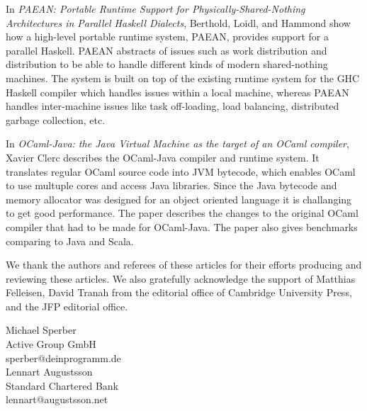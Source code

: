 \documentclass{jfp1}
\begin{document}
In \textit{PAEAN: Portable Runtime Support for Physically-Shared-Nothing Architectures in Parallel Haskell Dialects},
Berthold, Loidl, and Hammond show how a high-level portable runtime system, PAEAN, provides
support for a parallel Haskell.
PAEAN abstracts of issues such as work distribution and distribution to be able
to handle different kinds of modern shared-nothing machines.
The system is built on top of the existing runtime system for the GHC Haskell compiler
which handles issues within a local machine, whereas PAEAN handles inter-machine
issues like task off-loading, load balancing, distributed garbage collection, etc.

In \textit{OCaml-Java: the Java Virtual Machine as the target of an OCaml compiler},
Xavier Clerc describes the OCaml-Java compiler and runtime system.
It translates regular OCaml source code into JVM bytecode, which enables
OCaml to use multuple cores and access Java libraries.
Since the Java bytecode and memory allocator was designed for an object oriented
language it is challanging to get good performance.
The paper describes the changes to the original OCaml compiler that had to be
made for OCaml-Java.  The paper also gives benchmarks comparing to Java and Scala.

We thank the authors and referees of these articles for their efforts
producing and reviewing these articles.  We also gratefully
acknowledge the support of Matthias Felleisen, David Tranah from the
editorial office of Cambridge University Press, and the JFP editorial
office.

\begin{flushright}
 Michael Sperber\\
  Active Group GmbH\\
  sperber@deinprogramm.de\\[2mm]
  Lennart Augustsson\\
  Standard Chartered Bank\\
  lennart@augustsson.net
\end{flushright}
\end{document}
